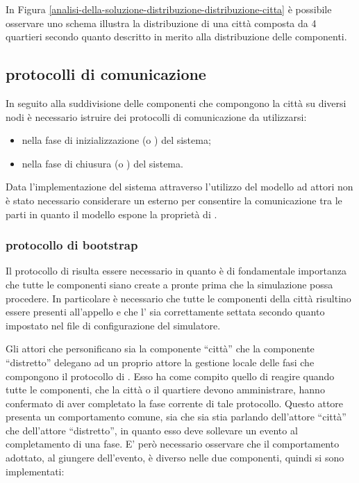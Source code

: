 In Figura \ref{analisi-della-soluzione-distribuzione-distribuzione-citta} è possibile osservare uno schema illustra la distribuzione di una città composta da 4 quartieri secondo quanto descritto in merito alla distribuzione delle componenti.

\subsection*{protocolli di comunicazione}
\label{analisi-della-soluzione-distribuzione-protocolli-di-comunicazione}
In seguito alla suddivisione delle componenti che compongono la città su diversi nodi è necessario istruire dei protocolli di comunicazione da utilizzarsi:

\begin{itemize}
\item{nella fase di inizializzazione (o ) del sistema;}
\item{nella fase di chiusura (o ) del sistema.}
\end{itemize}

Data l'implementazione del sistema attraverso l'utilizzo del modello ad attori non è stato necessario considerare un  esterno per consentire la comunicazione tra le parti in quanto il modello espone la proprietà di .

\subsubsection*{protocollo di bootstrap}
Il protocollo di  risulta essere necessario in quanto è di fondamentale importanza che tutte le componenti siano create a pronte prima che la simulazione possa procedere. In particolare è necessario che tutte le componenti della città risultino essere presenti all'appello e che l' sia correttamente settata secondo quanto impostato nel file di configurazione del simulatore.

Gli attori che personificano sia la componente ``città'' che la componente ``distretto'' delegano ad un proprio attore la gestione locale delle fasi che compongono il protocollo di . Esso ha come compito quello di reagire quando tutte le componenti, che la città o il quartiere devono amministrare, hanno confermato di aver completato la fase corrente di tale protocollo. Questo attore presenta un comportamento comune, sia che sia stia parlando dell'attore ``città'' che dell'attore ``distretto'', in quanto esso deve sollevare un evento al completamento di una fase. E' però necessario osservare che il comportamento adottato, al giungere dell'evento, è diverso nelle due componenti, quindi si sono implementati:


